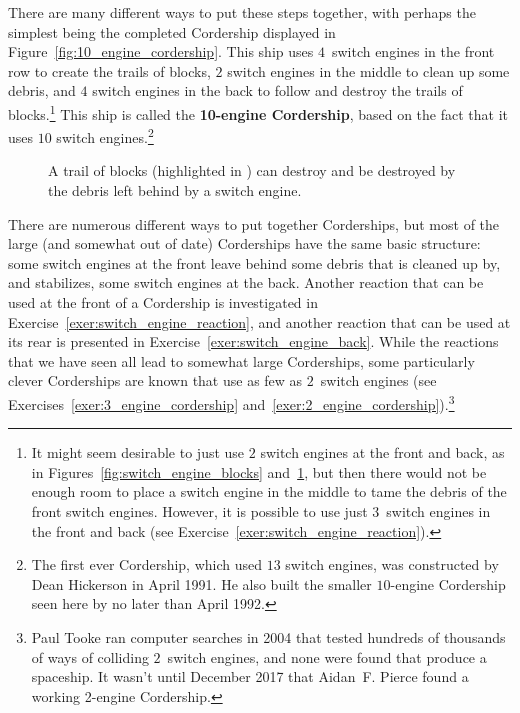 There are many different ways to put these steps together, with perhaps the simplest being the completed Cordership displayed in Figure~\ref{fig:10_engine_cordership}. This ship uses $4$~switch engines in the front row to create the trails of blocks, $2$ switch engines in the middle to clean up some debris, and $4$ switch engines in the back to follow and destroy the trails of blocks.\footnote{It might seem desirable to just use $2$ switch engines at the front and back, as in Figures~\ref{fig:switch_engine_blocks} and~\ref{fig:switch_engine_blocks_destroy}, but then there would not be enough room to place a switch engine in the middle to tame the debris of the front switch engines. However, it is possible to use just $3$~switch engines in the front and back (see Exercise~\ref{exer:switch_engine_reaction}).} This ship is called the \textbf{10-engine Cordership}, based on the fact that it uses $10$ switch engines.\footnote{The first ever Cordership, which used $13$ switch engines, was constructed by Dean Hickerson in April 1991. He also built the smaller $10$-engine Cordership seen here by no later than April 1992.}

\begin{figure}[!htb]
	\centering{}
	\caption{A trail of blocks (highlighted in ) can destroy and be destroyed by the debris left behind by a switch engine.}\label{fig:switch_engine_blocks_destroy}
\end{figure}

There are numerous different ways to put together Corderships, but most of the large (and somewhat out of date) Corderships have the same basic structure: some switch engines at the front leave behind some debris that is cleaned up by, and stabilizes, some switch engines at the back. Another reaction that can be used at the front of a Cordership is investigated in Exercise~\ref{exer:switch_engine_reaction}, and another reaction that can be used at its rear is presented in Exercise~\ref{exer:switch_engine_back}. While the reactions that we have seen all lead to somewhat large Corderships, some particularly clever Corderships are known that use as few as $2$~switch engines (see Exercises~\ref{exer:3_engine_cordership} and~\ref{exer:2_engine_cordership}).\footnote{Paul Tooke ran computer searches in 2004 that tested hundreds of thousands of ways of colliding $2$~switch engines, and none were found that produce a spaceship. It wasn't until December 2017 that Aidan~F. Pierce found a working 2-engine Cordership.}

